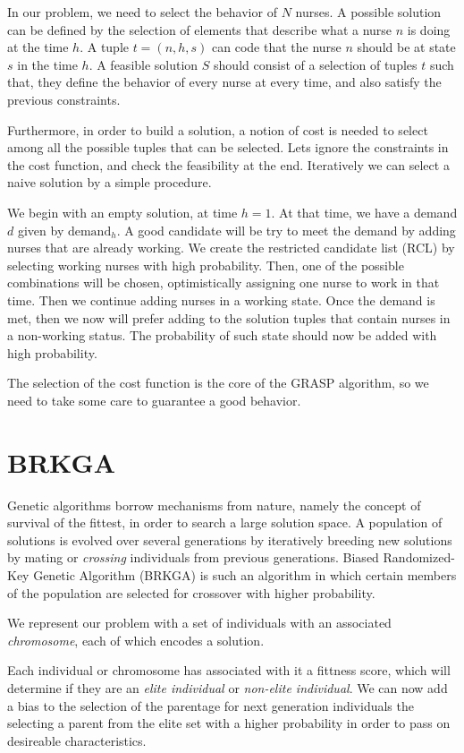\documentclass[12pt,a4paper]{article}
\begin{document}
In our problem, we need to select the behavior of $N$ nurses. A possible solution
can be defined by the selection of elements that describe what a nurse $n$ is
doing at the time $h$. A tuple $t = (n, h, s)$ can code that the nurse $n$
should be at state $s$ in the time $h$. A feasible solution $S$ should consist
of a selection of tuples $t$ such that, they define the behavior of every nurse
at every time, and also satisfy the previous constraints.

Furthermore, in order to build a solution, a notion of cost is needed to select
among all the possible tuples that can be selected. Lets ignore the constraints
in the cost function, and check the feasibility at the end. Iteratively we can
select a naive solution by a simple procedure.


We begin with an empty solution, at time $h = 1$. At that time, we have a demand $d$ given by
$\textrm{demand}_h$. A good candidate will be try to meet the demand by adding nurses that are already working. We create the restricted candidate list (RCL) by selecting working nurses with high probability. Then, one of the possible
combinations will be chosen, optimistically assigning one nurse to work in that time.
Then we continue adding nurses in a working state. Once the demand is met, then
we now will prefer adding to the solution tuples that contain nurses in a
non-working status. The probability of such state should now be added with high
probability.

The selection of the cost function is the core of the GRASP algorithm, so we
need to take some care to guarantee a good behavior.

\section{BRKGA}
%
Genetic algorithms borrow mechanisms from nature, namely the concept of survival 
of the fittest, in order to search a large solution space. A population of 
solutions is evolved over several generations by iteratively breeding new 
solutions by mating or \textit{crossing} individuals from previous generations. 
Biased Randomized-Key Genetic Algorithm (BRKGA) is such an algorithm in which 
certain members of the population are selected for crossover with higher 
probability.

We represent our problem with a set of individuals with an associated 
\textit{chromosome}, each of which encodes a solution.

Each individual or chromosome has associated with it a fittness score, which 
will determine if they are an \textit{elite individual} or \textit{non-elite 
individual}. We can now add a bias to the selection of the parentage for next 
generation individuals the selecting a parent from the elite set with a higher 
probability in order to pass on desireable characteristics.
\end{document}
